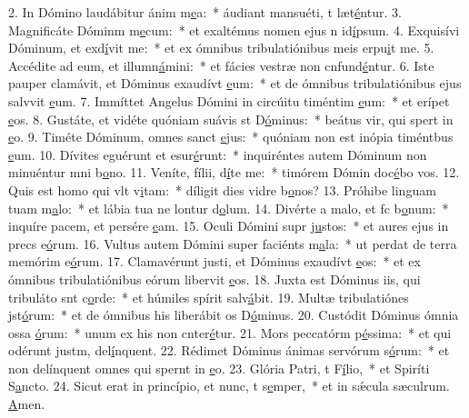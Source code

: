 2. In Dómino laudábitur ánim m\uline{e}a:~* áudiant mansuéti, t læt\uline{é}ntur.
3. Magnificáte Dóminm m\uline{e}cum:~* et exaltémus nomen ejus n id\uline{í}psum.
4. Exquisívi Dóminum, et exd\uline{í}vit me:~* et ex ómnibus tribulatiónibus meis erpu\uline{i}t me.
5. Accédite ad eum, et illumn\uline{á}mini:~* et fácies vestræ non cnfund\uline{é}ntur.
6. Iste pauper clamávit, et Dóminus exaudívt \uline{e}um:~* et de ómnibus tribulatiónibus ejus salvvit \uline{e}um.
7. Immíttet Angelus Dómini in circúitu timéntim \uline{e}um:~* et erípet \uline{e}os.
8. Gustáte, et vidéte quóniam suávis st D\uline{ó}minus:~* beátus vir, qui spert in \uline{e}o.
9. Timéte Dóminum, omnes sanct \uline{e}jus:~* quóniam non est inópia timéntbus \uline{e}um.
10. Dívites eguérunt et esur\uline{é}runt:~* inquiréntes autem Dóminum non minuéntur mni b\uline{o}no.
11. Veníte, fílii, d\uline{í}te me:~* timórem Dómin doc\uline{é}bo vos.
12. Quis est homo qui vlt v\uline{i}tam:~* díligit dies vidre b\uline{o}nos?
13. Próhibe linguam tuam  m\uline{a}lo:~* et lábia tua ne lontur d\uline{o}lum.
14. Divérte a malo, et fc b\uline{o}num:~* inquíre pacem, et persére \uline{e}am.
15. Oculi Dómini supr j\uline{u}stos:~* et aures ejus in precs e\uline{ó}rum.
16. Vultus autem Dómini super faciénts m\uline{a}la:~* ut perdat de terra memórim e\uline{ó}rum.
17. Clamavérunt justi, et Dóminus exaudívt \uline{e}os:~* et ex ómnibus tribulatiónibus eórum libervit \uline{e}os.
18. Juxta est Dóminus iis, qui tribuláto snt c\uline{o}rde:~* et húmiles spírit salv\uline{á}bit.
19. Multæ tribulatiónes jst\uline{ó}rum:~* et de ómnibus his liberábit os D\uline{ó}minus.
20. Custódit Dóminus ómnia ossa \uline{ó}rum:~* unum ex his non cnter\uline{é}tur.
21. Mors peccatórm p\uline{é}ssima:~* et qui odérunt justm, del\uline{í}nquent.
22. Rédimet Dóminus ánimas servórum s\uline{ó}rum:~* et non delínquent omnes qui spernt in \uline{e}o.
23. Glória Patri, t F\uline{í}lio,~* et Spiríti S\uline{a}ncto.
24. Sicut erat in princípio, et nunc, t s\uline{e}mper,~* et in sǽcula sæculrum. \uline{A}men.
